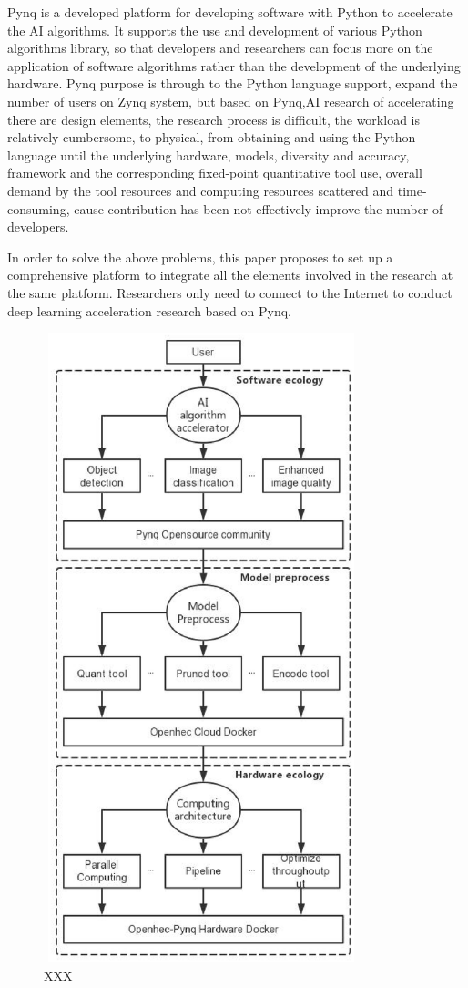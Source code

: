 Pynq is a developed platform for developing software with Python to accelerate the AI algorithms. It supports the use and development of various Python algorithms library, so that developers and researchers can focus more on the application of software algorithms rather than the development of the underlying hardware. Pynq purpose is through to the Python language support, expand the number of users on Zynq system, but based on Pynq,AI research of accelerating there are design elements, the research process is difficult, the workload is relatively cumbersome, to physical, from obtaining and using the Python language until the underlying hardware, models, diversity and accuracy, framework and the corresponding fixed-point quantitative tool use, overall demand by the tool resources and computing resources scattered and time-consuming, cause contribution has been not effectively improve the number of developers.

In order to solve the above problems, this paper proposes to set up a comprehensive platform to integrate all the elements involved in the research at the same platform. Researchers only need to connect to the Internet to conduct deep learning acceleration research based on Pynq.

\begin{figure}
\includegraphics[height=7.2in, width=3.6in]{figure_0}
\caption{XXX}
\end{figure}

